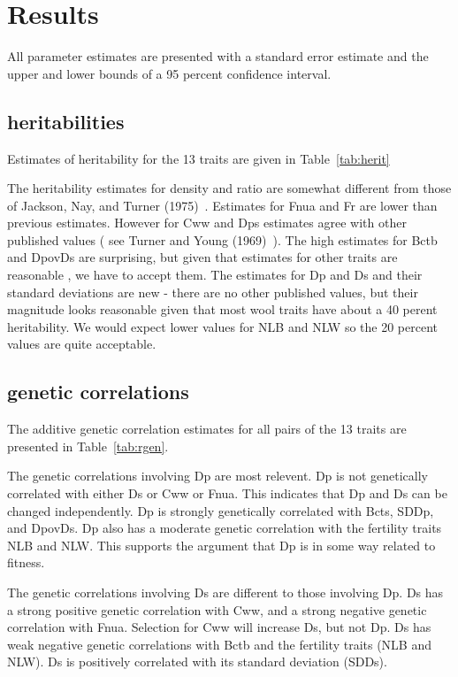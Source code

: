 \documentclass[titlepage]{article}  %
\begin{document}
\section{Results}
All parameter estimates are presented with a standard error estimate and the upper and lower bounds of a 95 percent confidence interval.
\subsection{heritabilities}
Estimates of heritability for the 13 traits are given in Table~\ref{tab:herit}

The heritability estimates for density and ratio are somewhat different from those of Jackson, Nay, and Turner (1975)~\cite{jack:75}. Estimates for Fnua and Fr are lower than previous estimates. However  for Cww and Dps estimates agree with other published values ( see Turner and Young (1969)~\cite{turn:69}). The high estimates for Bctb and DpovDs are surprising, but given that estimates for other traits are reasonable , we have to accept them. The estimates for Dp and Ds and their standard deviations are new - there are no other published values, but their magnitude looks reasonable given that most wool traits have about a 40 perent heritability. We would expect lower values for NLB and NLW so the 20 percent values are quite acceptable.

\subsection{genetic correlations}
The additive genetic correlation estimates for all pairs of the 13 traits are presented in Table~\ref{tab:rgen}.

The genetic correlations involving Dp are most relevent. Dp is not genetically correlated with either Ds or Cww or Fnua.  This indicates that Dp and Ds can be changed independently. Dp is strongly genetically correlated with Bcts, SDDp, and DpovDs. Dp also has a moderate genetic correlation with the fertility traits NLB and NLW.  This supports the argument that Dp  is in some way related to fitness.

The genetic correlations involving Ds are different to those involving Dp. Ds has a strong positive genetic correlation with Cww, and a strong negative genetic correlation with Fnua. Selection for Cww will increase Ds, but not Dp. Ds has weak negative genetic correlations with Bctb and the fertility traits (NLB and NLW). Ds is positively correlated with its standard deviation (SDDs).
\end{document}
